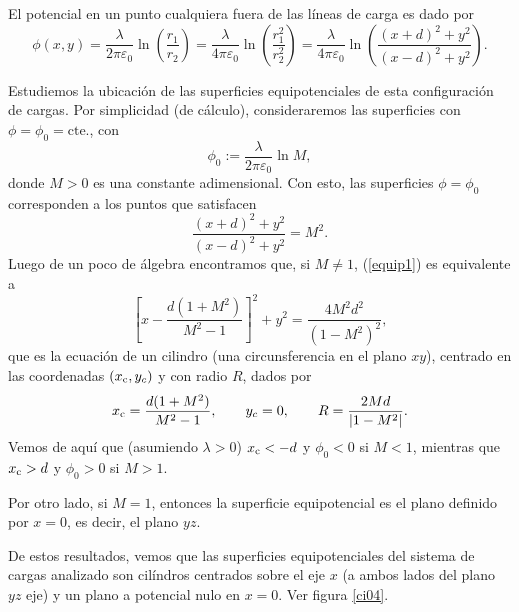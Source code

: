 El potencial en un punto cualquiera fuera de las líneas de carga es dado por
\begin{equation}
 \phi(x,y)=\frac{\lambda}{2\pi\varepsilon_0}\ln\left(\frac{r_1}{r_2}
\right)=\frac{\lambda}{4\pi\varepsilon_0}\ln\left(\frac{r_1^2}{r_2^2}
\right)=\frac{\lambda}{4\pi\varepsilon_0}\ln\left(\frac{(x+d)^2+y^2}{
(x-d)^2+y^2}\right).
\end{equation}

Estudiemos la ubicación de las superficies equipotenciales de esta
configuración de cargas. Por simplicidad (de cálculo), consideraremos las superficies con $\phi=\phi_0=\text{cte.}$, con
\begin{equation}
 \phi_0:=\frac{\lambda}{2\pi\varepsilon_0}\ln M, \label{phi0M}
\end{equation}
donde $M>0$ es una constante adimensional.  Con esto, las superficies $\phi=\phi_0$
corresponden a los puntos que satisfacen
\begin{equation}
 \frac{(x+d)^2+y^2}{(x-d)^2+y^2}=M^2. \label{equip1}
\end{equation}
Luego de un poco de álgebra encontramos que, si $M\neq 1$, (\ref{equip1}) es
equivalente a
\begin{equation}
 \left[x-\frac{d(1+M^2)}{M^2-1}\right]^2+y^2=\frac{4M^2d^2}{(1-M^2)^2},
\end{equation}
que es la ecuación de un cilindro (una circunsferencia en el plano $xy$),
centrado en las coordenadas $(x_{\rm c},y_c)$ y con radio $R$, dados por
\begin{equation}
 x_{\rm c}=\frac{d(1+M^2)}{M^2-1}, \qquad y_c=0, \qquad R=\frac{2Md}{|1-M^2|}.
\label{cilim}
\end{equation}
Vemos de aquí que (asumiendo $\lambda>0$) $x_{\rm c}<-d$ y $\phi_0<0$ si $M<1$,
mientras que $x_{\rm c}>d$ y $\phi_0>0$ si $M>1$.

Por otro lado, si $M=1$, entonces la superficie equipotencial es el plano
definido por $x=0$, es decir, el plano $yz$.

De estos resultados, vemos que las superficies equipotenciales del sistema de
cargas analizado son cilíndros centrados sobre el eje $x$ (a ambos lados del
plano $yz$ eje) y un plano a potencial nulo en $x=0$. Ver figura \ref{ci04}.
%

